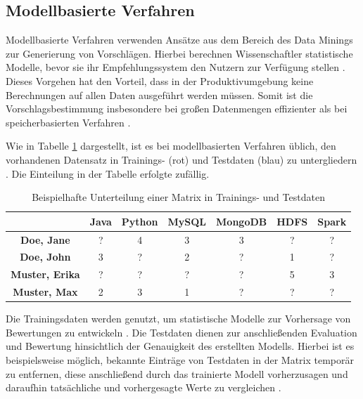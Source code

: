 \subsection{Modellbasierte Verfahren}
\label{ch:empfehlungssysteme:cf:modellbasiert}
Modellbasierte Verfahren verwenden Ansätze aus dem Bereich des Data Minings zur Generierung von Vorschlägen. Hierbei berechnen Wissenschaftler statistische Modelle, bevor sie ihr Empfehlungssystem den Nutzern zur Verfügung stellen \cite[S. 2]{cui:2020}. Dieses Vorgehen hat den Vorteil, dass in der Produktivumgebung keine Berechnungen auf allen Daten ausgeführt werden müssen. Somit ist die Vorschlagsbestimmung insbesondere bei großen Datenmengen effizienter als bei speicherbasierten Verfahren \cite[S. 8]{yang:2016}.

Wie in Tabelle \ref{tbl:empfehlungssysteme:cf:modellbasiert:tbl1} dargestellt, ist es bei modellbasierten Verfahren üblich, den vorhandenen Datensatz in Trainings- (rot) und Testdaten (blau) zu untergliedern \cite[S. 71f.]{recommenderSystems:2016}. Die Einteilung in der Tabelle erfolgte zufällig.

\begin{table}[h]
	\centering
	\begin{tabular}{c|c|c|c|c|c|c}
		& \textbf{Java} & \textbf{Python} & \textbf{MySQL} & \textbf{MongoDB} & \textbf{HDFS} & \textbf{Spark}\\ 
		\hline
		\textbf{Doe, Jane} & ? & \cellcolor{itemcolor}4 & \cellcolor{itemcolor}3 & \cellcolor{usercolor}3 & ? & ?\\
		\textbf{Doe, John} & \cellcolor{itemcolor}3 & ? & \cellcolor{usercolor}2 & ? & \cellcolor{usercolor}1 & ?\\
		\textbf{Muster, Erika} & ? & ? & ? & ? & \cellcolor{itemcolor}5 & \cellcolor{usercolor}3\\
		\textbf{Muster, Max} & \cellcolor{itemcolor}2 & \cellcolor{usercolor}3 & \cellcolor{itemcolor}1 & ? & ? & ?\\
	\end{tabular}
	\caption{Beispielhafte Unterteilung einer Matrix in Trainings- und Testdaten}
	\label{tbl:empfehlungssysteme:cf:modellbasiert:tbl1}
\end{table}

Die Trainingsdaten werden genutzt, um statistische Modelle zur Vorhersage von Bewertungen zu entwickeln \cite[S. 71f.]{recommenderSystems:2016}. Die Testdaten dienen zur anschließenden Evaluation und Bewertung hinsichtlich der Genauigkeit des erstellten Modells. Hierbei ist es beispielsweise möglich, bekannte Einträge von Testdaten in der Matrix temporär zu entfernen, diese anschließend durch das trainierte Modell vorherzusagen und daraufhin tatsächliche und vorhergesagte Werte zu vergleichen \cite[S. 3ff.]{kang:2016}.

